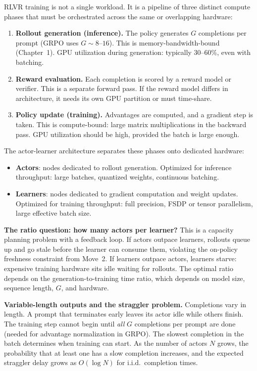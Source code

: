 RLVR training is not a single workload. It is a pipeline of three distinct compute phases that must be orchestrated across the same or overlapping hardware:

\begin{enumerate}
  \item \textbf{Rollout generation (inference).} The policy generates $G$ completions per prompt (GRPO uses $G \sim 8$--$16$). This is memory-bandwidth-bound (Chapter~1). GPU utilization during generation: typically 30--60\%, even with batching.
  \item \textbf{Reward evaluation.} Each completion is scored by a reward model or verifier. This is a separate forward pass. If the reward model differs in architecture, it needs its own GPU partition or must time-share.
  \item \textbf{Policy update (training).} Advantages are computed, and a gradient step is taken. This is compute-bound: large matrix multiplications in the backward pass. GPU utilization should be high, provided the batch is large enough.
\end{enumerate}

The actor-learner architecture separates these phases onto dedicated hardware:

\begin{itemize}
  \item \textbf{Actors}: nodes dedicated to rollout generation. Optimized for inference throughput: large batches, quantized weights, continuous batching.
  \item \textbf{Learners}: nodes dedicated to gradient computation and weight updates. Optimized for training throughput: full precision, FSDP or tensor parallelism, large effective batch size.
\end{itemize}

\textbf{The ratio question: how many actors per learner?} This is a capacity planning problem with a feedback loop. If actors outpace learners, rollouts queue up and go stale before the learner can consume them, violating the on-policy freshness constraint from Move~2. If learners outpace actors, learners starve: expensive training hardware sits idle waiting for rollouts. The optimal ratio depends on the generation-to-training time ratio, which depends on model size, sequence length, $G$, and hardware.

\textbf{Variable-length outputs and the straggler problem.} Completions vary in length. A prompt that terminates early leaves its actor idle while others finish. The training step cannot begin until \textit{all} $G$ completions per prompt are done (needed for advantage normalization in GRPO). The slowest completion in the batch determines when training can start. As the number of actors $N$ grows, the probability that at least one has a slow completion increases, and the expected straggler delay grows as $O(\log N)$ for i.i.d.\ completion times.

